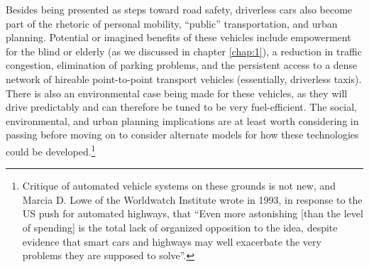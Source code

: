 Besides being presented as steps toward road safety, driverless cars
also become part of the rhetoric of personal mobility, ``public''
transportation, and urban planning. Potential or imagined
benefits of these vehicles include empowerment for the blind or
elderly (as we discussed in chapter \ref{chap:1}), a reduction in
traffic congestion, elimination of parking problems, and the
persistent access to a dense network of hireable point-to-point
transport vehicles (essentially, driverless taxis). There is
  also an environmental case being made for these vehicles, as they
  will drive predictably and can therefore be tuned to be very
  fuel-efficient. The social, environmental, and urban planning
implications are at least worth considering in passing before moving
on to consider alternate models for how these technologies could be
developed.\footnote{Critique of automated vehicle systems on these
  grounds is not new, and Marcia D. Lowe of the Worldwatch
    Institute wrote in 1993, in response to
the US push for automated highways, that ``Even more astonishing [than
  the level of spending] is
the total lack of organized opposition to the idea, despite evidence
that smart cars and highways may well exacerbate the very problems
they are supposed to solve''\cite{???-novakNationalAutomated}.}


